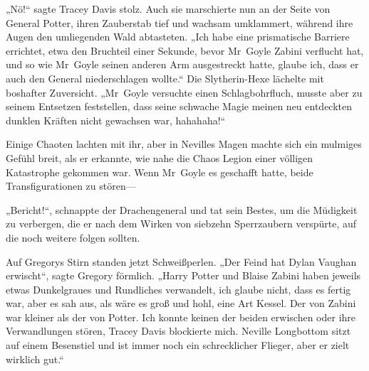 „Nö!“ sagte Tracey Davis stolz. Auch sie marschierte nun an der Seite von General Potter, ihren Zauberstab tief und wachsam umklammert, während ihre Augen den umliegenden Wald abtasteten. „Ich habe eine prismatische Barriere errichtet, etwa den Bruchteil einer Sekunde, bevor Mr~Goyle Zabini verflucht hat, und so wie Mr~Goyle seinen anderen Arm ausgestreckt hatte, glaube ich, dass er auch den General niederschlagen wollte.“ Die Slytherin-Hexe lächelte mit boshafter Zuversicht. „Mr~Goyle versuchte einen Schlagbohrfluch, musste aber zu seinem Entsetzen feststellen, dass seine schwache Magie meinen neu entdeckten dunklen Kräften nicht gewachsen war, hahahaha!“

Einige Chaoten lachten mit ihr, aber in Nevilles Magen machte sich ein mulmiges Gefühl breit, als er erkannte, wie nahe die Chaos Legion einer völligen Katastrophe gekommen war. Wenn Mr~Goyle es geschafft hatte, beide Transfigurationen zu stören—

\later

„Bericht!“, schnappte der Drachengeneral und tat sein Bestes, um die Müdigkeit zu verbergen, die er nach dem Wirken von siebzehn Sperrzaubern verspürte, auf die noch weitere folgen sollten.

Auf Gregorys Stirn standen jetzt Schweißperlen. „Der Feind hat Dylan Vaughan erwischt“, sagte Gregory förmlich. „Harry Potter und Blaise Zabini haben jeweils etwas Dunkelgraues und Rundliches verwandelt, ich glaube nicht, dass es fertig war, aber es sah aus, als wäre es groß und hohl, eine Art Kessel. Der von Zabini war kleiner als der von Potter. Ich konnte keinen der beiden erwischen oder ihre Verwandlungen stören, Tracey Davis blockierte mich. Neville Longbottom sitzt auf einem Besenstiel und ist immer noch ein schrecklicher Flieger, aber er zielt wirklich gut.“

